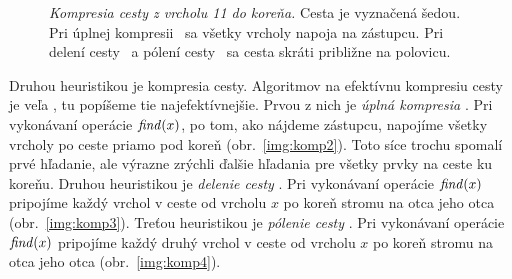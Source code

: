 \begin{figure}
\qquad
{}
\caption{\emph{Kompresia cesty z vrcholu 11 do koreňa.} 
Cesta je vyznačená šedou. 
Pri úplnej kompresii~ sa všetky vrcholy 
napoja na zástupcu. Pri delení cesty~ a pólení 
cesty~ sa cesta skráti približne na polovicu.}
\label{img:kompresia}
\end{figure}
 
Druhou heuristikou je kompresia cesty. Algoritmov na efektívnu kompresiu 
cesty je veľa \citep{paths2}, tu popíšeme tie najefektívnejšie. Prvou z nich 
je \emph{úplná kompresia} \citep{comp1}. Pri vykonávaní operácie $\mathop{\mathit{find}}(x)$, po 
tom, ako nájdeme zástupcu, napojíme všetky vrcholy po ceste priamo pod koreň 
(obr.~\ref{img:komp2}). Toto síce trochu spomalí prvé hľadanie, ale výrazne 
zrýchli ďalšie hľadania pre všetky prvky na ceste ku koreňu. Druhou 
heuristikou je \emph{delenie cesty} \citep{comp2}. Pri vykonávaní operácie 
$\mathop{\mathit{find}}(x)$ pripojíme každý vrchol v ceste od vrcholu $x$ po koreň stromu na otca 
jeho otca (obr.~\ref{img:komp3}). Treťou heuristikou je \emph{pólenie cesty} 
\citep{comp2}. Pri vykonávaní operácie $\mathop{\mathit{find}}(x)$  pripojíme každý druhý vrchol 
v ceste od vrcholu $x$ po koreň stromu na otca jeho otca 
(obr.~\ref{img:komp4}).

